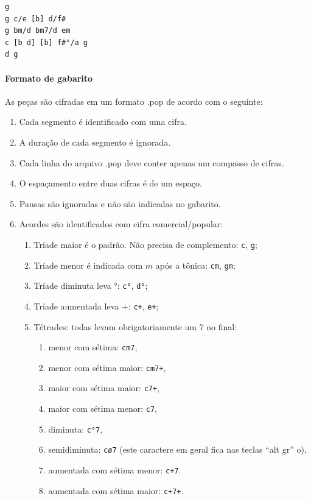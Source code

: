 \documentclass[12pt,brazil]{book}
\begin{document}
\begin{verbatim}
g
g c/e [b] d/f#
g bm/d bm7/d em
c [b d] [b] f#°/a g
d g
\end{verbatim}

\paragraph{Formato de gabarito}
\label{sec:formato-de-gabarito}

As peças são cifradas em um formato .pop de acordo com o seguinte:

\begin{enumerate}
\item Cada segmento é identificado com uma cifra.
\item A duração de cada segmento é ignorada.
\item Cada linha do arquivo .pop deve conter apenas um compasso de
  cifras.
\item O espaçamento entre duas cifras é de um espaço.
\item Pausas são ignoradas e não são indicadas no gabarito.
\item Acordes são identificados com cifra comercial/popular:
  \begin{enumerate}
  \item Tríade maior é o padrão. Não precisa de complemento:
    \texttt{c}, \texttt{g};
  \item Tríade menor é indicada com $m$ após a tônica: \texttt{cm},
    \texttt{gm};
  \item Tríade diminuta leva $°$: \texttt{c°}, \texttt{d°};
  \item Tríade aumentada leva $+$: \texttt{c+}, \texttt{e+};
  \item Tétrades: todas levam obrigatoriamente um 7 no final:
    \begin{enumerate}
    \item menor com sétima: \texttt{cm7},
    \item menor com sétima maior: \texttt{cm7+},
    \item maior com sétima maior: \texttt{c7+},
    \item maior com sétima menor: \texttt{c7},
    \item diminuta: \texttt{c°7},
    \item semidiminuta: \texttt{cø7} (este caractere em geral fica nas
      teclas ``alt gr'' o),
    \item aumentada com sétima menor: \texttt{c+7}.
    \item aumentada com sétima maior: \texttt{c+7+}.

\end{enumerate}
\end{enumerate}
\end{enumerate}
\end{document}
